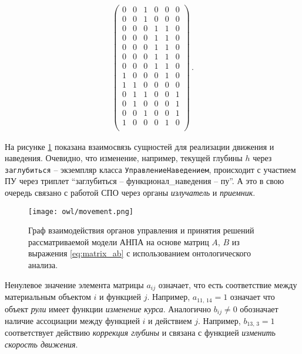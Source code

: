 \begin{equation}
\begin{split}
\begin{pmatrix}
        0 & 0 & 1 & 0 & 0 & 0 \\
        0 & 0 & 1 & 0 & 0 & 0 \\
        0 & 0 & 0 & 1 & 1 & 0 \\
        0 & 0 & 0 & 1 & 1 & 0 \\
        0 & 0 & 0 & 1 & 1 & 0 \\
        0 & 0 & 0 & 1 & 1 & 0 \\
        0 & 0 & 0 & 1 & 1 & 0 \\
        1 & 0 & 0 & 0 & 1 & 0 \\
        1 & 1 & 0 & 0 & 0 & 0 \\
        0 & 1 & 1 & 0 & 0 & 1 \\
        0 & 1 & 0 & 0 & 0 & 1 \\
        0 & 0 & 1 & 0 & 0 & 1 \\
        1 & 0 & 0 & 0 & 1 & 0 \\
    \end{pmatrix}\,.
\end{split}
\end{equation}

На рисунке \ref{fig:owl_ontograph} показана взаимосвязь сущностей для реализации движения и наведения.
Очевидно, что изменение, например, текущей глубины $h$ через \texttt{заглубиться} -- экземпляр класса \texttt{УправлениеНаведением},
происходит с участием ПУ через триплет ``заглубиться -- функционал\_наведения -- пу''.
А это в свою очередь связано с работой СПО через органы \textit{излучатель} и \textit{приемник}.

\begin{center}
    \begin{figure}[hb!]
        \texttt{[image: owl/movement.png]}
        \caption{Граф взаимодействия органов управления и принятия решений рассматриваемой модели АНПА
                    на основе матриц $A$, $B$ из выражения \ref{eq:matrix_ab} с использованием онтологического анализа.}
            \label{fig:owl_ontograph}
    \end{figure}
\end{center}

Ненулевое значение элемента матрицы $a_{ij}$ означает, что есть соответствие между материальным объектом $i$ и функцией $j$.
Например, $a_{11,\,14} = 1$ означает что объект \textit{рули} имеет функции \textit{изменение курса}.
Аналогично $b_{ij} \ne 0$ обозначает наличие ассоциации между функцией $i$ и действием $j$.
Например, $b_{13,\,3} = 1$ соответствует действию \textit{коррекция глубины} и связана с функцией \textit{изменить скорость движения}.

